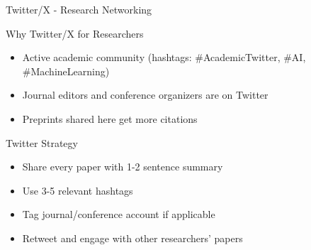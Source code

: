 \documentclass[11pt]{beamer}
\begin{document}
	\begin{frame}{Twitter/X - Research Networking}
		\scriptsize
		\begin{block}{Why Twitter/X for Researchers}
			\begin{itemize}
				\item Active academic community (hashtags: \#AcademicTwitter, \#AI, \#MachineLearning)
				\item Journal editors and conference organizers are on Twitter
				\item Preprints shared here get more citations
			\end{itemize}
		\end{block}
		\begin{block}{Twitter Strategy}
			\begin{itemize}
				\item Share every paper with 1-2 sentence summary
				\item Use 3-5 relevant hashtags
				\item Tag journal/conference account if applicable
				\item Retweet and engage with other researchers' papers
			\end{itemize}
		\end{block}
	\end{frame}
	
\end{document}
